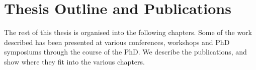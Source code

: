 \documentclass[thesis.tex]{subfiles}
\begin{document}
% 
% 
% 
% 

\section{Thesis Outline and Publications}

The rest of this thesis is organised into the following chapters.
Some of the work described has been presented at various conferences, workshops and PhD symposiums through the course of the PhD.
We describe the publications, and show where they fit into the various chapters.
\end{document}
